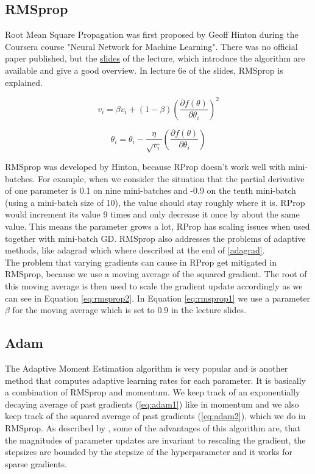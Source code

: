 \documentclass[aodsor,preprint]{imsart}
\numberwithin{equation}{section}
\theoremstyle{plain}
\begin{document}
\subsection{RMSprop}
Root Mean Square Propagation was first proposed by Geoff Hinton during the Coursera course "Neural Network for Machine Learning". There was no official paper published, but the \href{https://www.cs.toronto.edu/~tijmen/csc321/slides/lecture_slides_lec6.pdf}{slides} of the lecture, which introduce the algorithm are available and give a good overview. In lecture 6e of the slides, RMSprop is explained.

\begin{equation} \label{eq:rmsprop1}
v_{i} = \beta v_{i} + (1-\beta) \left(\frac{\partial f(\theta)}{\partial \theta_{i}}\right)^2
\end{equation}

\begin{equation} \label{eq:rmsprop2}
\theta_{i} = \theta_{i} - \frac{\eta}{\sqrt{v_{i}}} \left(\frac{\partial f(\theta)}{\partial \theta_{i}} \right)
\end{equation}

RMSprop was developed by Hinton, because RProp doesn't work well with mini-batches. For example, when we consider the situation that the partial derivative of one parameter is 0.1 on nine mini-batches and -0.9 on the tenth mini-batch (using a mini-batch size of 10), the value should stay roughly where it is. RProp would increment its value 9 times and only decrease it once by about the same value. This means the parameter grows a lot, RProp has scaling issues when used together with mini-batch GD. RMSprop also addresses the problems of adaptive methods, like adagrad which where described at the end of \ref{adagrad}. \\
The problem that varying gradients can cause in RProp get mitigated in RMSprop, because we use a moving average of the squared gradient. The root of this moving average is then used to scale the gradient update accordingly as we can see in Equation \ref{eq:rmsprop2}. In Equation \ref{eq:rmsprop1} we use a parameter $\beta$ for the moving average which is set to 0.9 in the lecture slides.

\subsection{Adam}
The Adaptive Moment Estimation algorithm is very popular and is another method that computes adaptive learning rates for each parameter. It is basically a combination of RMSprop and momentum. We keep track of an exponentially decaying average of past gradients (\ref{eq:adam1}) like in momentum and we also keep track of the squared average of past gradients (\ref{eq:adam2}), which we do in RMSprop. As described by \cite{adam}, some of the advantages of this algorithm are, that the magnitudes of parameter updates are invariant to rescaling the gradient, the stepsizes are bounded by the stepsize of the hyperparameter and it works for sparse gradients.
\end{document}
